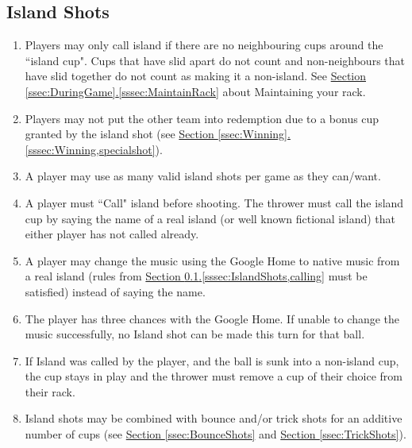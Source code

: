 	\subsection{Island Shots}\label{ssec:IslandShots}
		\begin{enumerate}[label=(\roman*), ref=\roman*]
            \item \label{sssec:IslandShots,conditon} Players may only call island if there are no neighbouring cups around the ``island cup".
                Cups that have slid apart do not count and non-neighbours that have slid together do not count as making it a non-island.
                See \hyperref[sssec:MaintainRack]{Section \ref*{ssec:DuringGame}.\ref*{sssec:MaintainRack}} about Maintaining your rack.
            \item \label{sssec:IslandShots,winning} Players may not put the other team into redemption due to a bonus cup granted by the island shot
                (see \hyperref[sssec:Winning,specialshot]{Section \ref*{ssec:Winning}.\ref*{sssec:Winning,specialshot}}).
            \item \label{sssec:IslandShots,times} A player may use as many valid island shots per game as they can/want.
            \item \label{sssec:IslandShots,calling} A player must ``Call" island before shooting.
                The thrower must call the island cup by saying the name of a real island (or well known fictional island) that either player has not called already.
            \item \label{sssec:IslandShots,musicCalling} A player may change the music using the Google Home to native music from a real island (rules from \hyperref[sssec:IslandShots,calling]{Section \ref*{ssec:IslandShots}.\ref*{sssec:IslandShots,calling}} must be satisfied) instead of saying the name.
            \item \label{sssec:IslandShots,musicAttempts} The player has three chances with the Google Home. If unable to change the music successfully, no Island shot can be made this turn for that ball.
            \item \label{sssec:IslandShots,missincup} If Island was called by the player, and the ball is sunk into a non-island cup, the cup stays in play and the thrower must remove a cup of their choice from their rack.	
            \item \label{sssec:IslandShots,combo} Island shots may be combined with bounce and/or trick shots for an additive number of cups
                (see \hyperref[ssec:BounceShots]{Section \ref*{ssec:BounceShots}} and \hyperref[ssec:TrickShots]{Section \ref*{ssec:TrickShots}}).

\end{enumerate}
